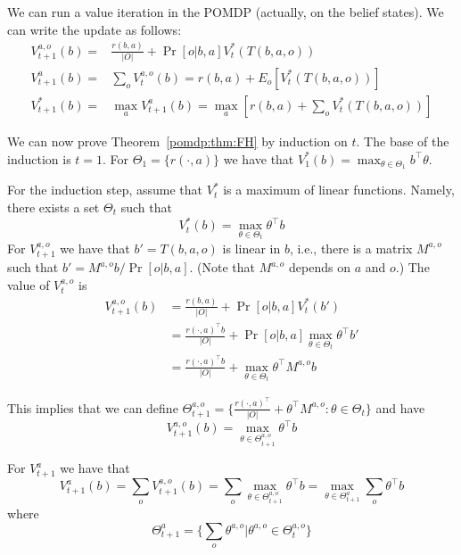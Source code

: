 We can run a value iteration in the POMDP (actually, on the belief states). We can write the update as follows:
\begin{align*}
V^{a,o}_{t+1}(b)=&\frac{r(b,a)}{|O|}+ \Pr[o|b,a]  V_t^*(T(b,a,o))\\
V_{t+1}^a(b)=&\sum_o V^{a,o}_{t}(b)= r(b,a)+ E_o [V_t^*(T(b,a,o))]\\
V_{t+1}^*(b)=&\max_a V_{t+1}^a(b) = \max_a [r(b,a)+\sum_o V_t^*(T(b,a,o))]
\end{align*}

We can now prove Theorem~\ref{pomdp:thm:FH} by induction on $t$. The base of the induction is $t=1$. For $\Theta_1=\{r(\cdot,a)\}$ we have that $V^*_1(b)=\max_{\theta\in\Theta_1}b^\top \theta$.

For the induction step, assume that $V_t^*$ is a maximum of linear functions. Namely, there exists a set $\Theta_t$ such that
\[
V^*_t(b)=\max_{\theta\in\Theta_t}\theta^\top b
\]
For $V_{t+1}^{a,o}$ we have that $b'=T(b,a,o)$ is linear in $b$, i.e., there is a matrix $M^{a,o}$ such that $b'=M^{a,o}b/\Pr[o|b,a]$. (Note that $M^{a,o}$ depends on
$a$ and $o$.) The value of $V_t^{a,o}$ is
\begin{align*}
V_{t+1}^{a,o}(b)
&=\frac{r(b,a)}{|O|}+ \Pr[o|b,a]  V_t^*(b')\\
&= \frac{r(\cdot,a)^\top b}{|O|}+  \Pr[o|b,a]  \max_{\theta\in\Theta_t} \theta^\top b'\\
&= \frac{r(\cdot,a)^\top b}{|O|}+  \max_{\theta\in\Theta_t} \theta^\top M^{a,o}b
\end{align*}

This implies that we can define $\Theta_{t+1}^{a,o}=\{\frac{r(\cdot,a)^\top}{|O|}+\theta^\top M^{a,o}:\theta \in \Theta_t\}$ and have
\[
V_{t+1}^{a,o}(b)= \max_{\theta\in\Theta_{t+1}^{a,o}}  \theta^\top b
\]

For $V^a_{t+1}$ we have that
\[
V_{t+1}^a(b)=\sum_o V_{t+1}^{a,o}(b)=\sum_o \max_{\theta\in\Theta_{t+1}^{a,o}}
\theta^\top b=\max_{\theta\in\Theta_{t+1}^{a}}\sum_o  \theta^\top b
\]
where
\[
\Theta^a_{t+1}=\{\sum_o
\theta^{a,o}|\theta^{a,o}\in\Theta^{a,o}_t\}
\]

